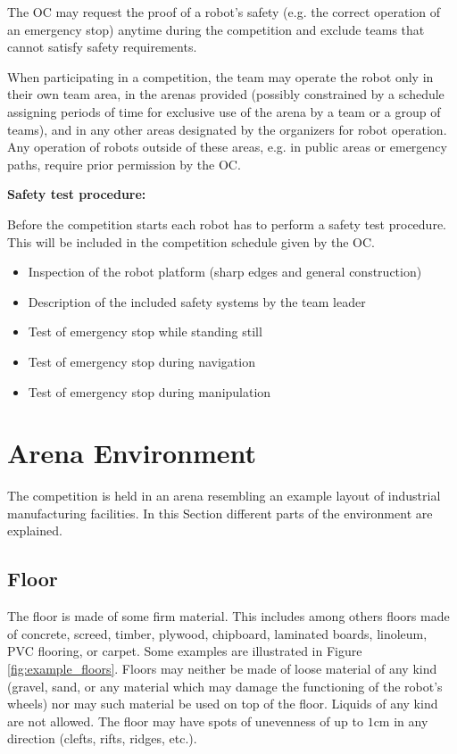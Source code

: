 The OC may request the proof of a robot's safety (e.g. the correct operation of an emergency stop) anytime during the competition and exclude teams that cannot satisfy safety requirements.

When participating in a competition, the team may operate the robot only in their own team area, in the arenas provided (possibly constrained by a schedule assigning periods of time for exclusive use of the arena by a team or a group of teams), and in any other areas designated by the organizers for robot operation. Any operation of robots outside of these areas, e.g. in public areas or emergency paths, require prior permission by the OC.

\textbf{Safety test procedure:}

Before the competition starts each robot has to perform a safety test procedure. This will be included in the competition schedule given by the OC.
\begin{itemize}
	\item Inspection of the robot platform (sharp edges and general construction)
	\item Description of the included safety systems by the team leader 
	\item Test of emergency stop while standing still
	\item Test of emergency stop during navigation 
	\item Test of emergency stop during manipulation
\end{itemize}


\clearpage

\section{Arena Environment}
\label{sec:ArenaDesign}
The competition is held in an arena resembling an example layout of industrial manufacturing facilities. In this Section different parts of the environment are explained.

\subsection{Floor}

The floor is made of some firm material. This includes among others floors made of concrete, screed, timber, plywood, chipboard, laminated boards, linoleum, PVC flooring, or carpet. Some examples are illustrated in Figure \ref{fig:example_floors}. Floors may neither be made of loose material of any kind (gravel, sand, or any material which may damage the functioning of the robot's wheels) nor may such material be used on top of the floor. Liquids of any kind are not allowed. The floor may have spots of unevenness of up to $1\si{\centi\meter}$ in any direction (clefts, rifts, ridges, etc.).



